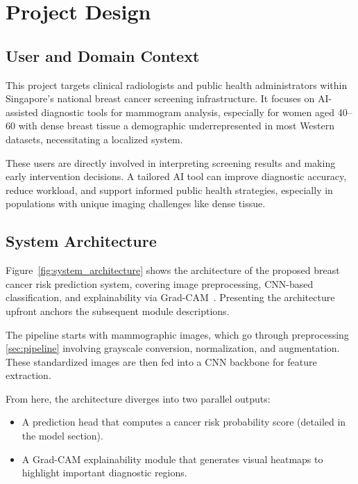 \documentclass[12pt]{article}
\begin{document}
\section{Project Design}
\label{chapter3}

\subsection{User and Domain Context}
This project targets clinical radiologists and public health administrators within Singapore’s national breast cancer screening infrastructure. It focuses on AI-assisted diagnostic tools for mammogram analysis, especially for women aged 40–60 with dense breast tissue a demographic underrepresented in most Western datasets, necessitating a localized system.

These users are directly involved in interpreting screening results and making early intervention decisions. A tailored AI tool can improve diagnostic accuracy, reduce workload, and support informed public health strategies, especially in populations with unique imaging challenges like dense tissue.

\subsection{System Architecture}

Figure~\ref{fig:system_architecture} shows the architecture of the proposed breast cancer risk prediction system, covering image preprocessing, CNN-based classification, and explainability via Grad-CAM~\cite{1,5}. Presenting the architecture upfront anchors the subsequent module descriptions.

The pipeline starts with mammographic images, which go through preprocessing {\ref{sec:pipeline}} involving grayscale conversion, normalization, and augmentation. These standardized images are then fed into a CNN backbone for feature extraction.


From here, the architecture diverges into two parallel outputs:
\begin{itemize}
    \item A prediction head that computes a cancer risk probability score (detailed in the model section).
    \item A Grad-CAM explainability module that generates visual heatmaps to highlight important diagnostic regions.
\end{itemize}
\end{document}
